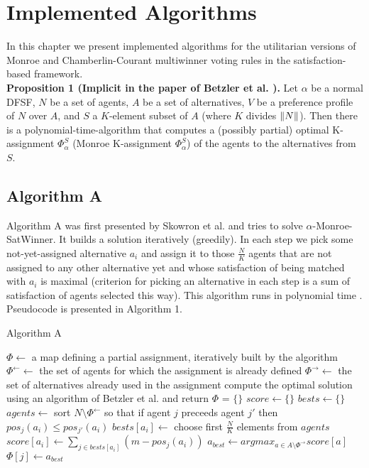 \chapter{Implemented Algorithms}
\label{cha:implementedAlgorithms}

In this chapter we present implemented algorithms for the utilitarian versions of Monroe and Chamberlin-Courant multiwinner voting rules in the satisfaction-based framework.
\\

\noindent
\textbf{Proposition 1 (Implicit in the paper of Betzler et al. \cite{3}).} Let $\alpha$ be a normal DFSF, $N$ be a set of agents, $A$ be a set of alternatives, $V$ be a preference profile of $N$ over $A$, and $S$ a $K$-element subset of $A$ (where $K$ divides $\lVert N\rVert$). Then there is a polynomial-time-algorithm that computes a (possibly partial) optimal K-assignment $\Phi^{S}_{\alpha}$ (Monroe K-assignment $\Phi^{S}_{\alpha}$) of the agents to the alternatives from $S$.
\\

\section{Algorithm A}

Algorithm A was first presented by Skowron et al. \cite{1} and tries to solve $\alpha$-Monroe-SatWinner. It builds a solution iteratively (greedily). In each step we pick some not-yet-assigned alternative $a_{i}$ and assign it to those $\frac{N}{K}$ agents that are not assigned to any other alternative yet and whose satisfaction of being matched with $a_{i}$ is maximal (criterion for picking an alternative in each step is a sum of satisfaction of agents selected this way). This algorithm runs in polynomial time \cite{1}. Pseudocode is presented in Algorithm 1.

\begin{algorithm}
\caption{Algorithm A}\label{euclid}
\begin{algorithmic}[1]
		\State $\Phi \gets$ a map defining a partial assignment, iteratively built by the algorithm
		\State $\Phi^{\leftarrow} \gets$ the set of agents for which the assignment is already defined
		\State $\Phi^{\rightarrow} \gets$ the set of alternatives already used in the assignment
			\State compute the optimal solution using an algorithm of Betzler et al. \cite{1} and return
		\EndIf
		\State $\Phi$ = $\{\}$
			\State $score \gets \{\}$
			\State $bests \gets \{\}$
				\State $agents \gets$ sort $N \setminus \Phi^{\leftarrow}$ so that if agent $j$ preceeds agent $j'$ then $pos_{j}(a_{i}) \leq pos_{j'}(a_{i})$
				\State $bests[a_{i}] \gets$ choose first $\frac{N}{K}$ elements from $agents$
				\State $score[a_{i}] \gets \sum_{j \in bests[a_{i}]}(m - pos_{j}(a_{i}))$
			\EndFor
			\State $a_{best} \gets argmax_{a \in A \setminus \Phi^{\rightarrow}} score[a]$
				\State $\Phi[j] \gets a_{best}$
			\EndFor
		\EndFor
	\EndProcedure
\end{algorithmic}
\end{algorithm}


